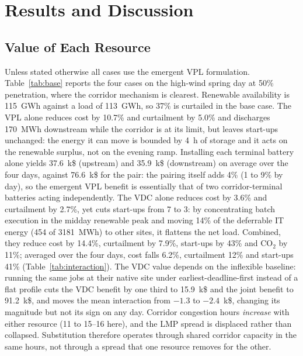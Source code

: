 \documentclass[conference]{IEEEtran}
\begin{document}
\section{Results and Discussion}
\label{sec:results}

\subsection{Value of Each Resource}
Unless stated otherwise all cases use the emergent VPL formulation. Table~\ref{tab:base} reports the four cases on the high-wind spring day at 50\% penetration, where the corridor mechanism is clearest. Renewable availability is 115~GWh against a load of 113~GWh, so 37\% is curtailed in the base case. The VPL alone reduces cost by 10.7\% and curtailment by 5.0\% and discharges 170~MWh downstream while the corridor is at its limit, but leaves start-ups unchanged: the energy it can move is bounded by 4~h of storage and it acts on the renewable surplus, not on the evening ramp. Installing each terminal battery alone yields 37.6~k\$ (upstream) and 35.9~k\$ (downstream) on average over the four days, against 76.6~k\$ for the pair: the pairing itself adds 4\% (1 to 9\% by day), so the emergent VPL benefit is essentially that of two corridor-terminal batteries acting independently. The VDC alone reduces cost by 3.6\% and curtailment by 2.7\%, yet cuts start-ups from 7 to 3: by concentrating batch execution in the midday renewable peak and moving 14\% of the deferrable IT energy (454 of 3181~MWh) to other sites, it flattens the net load. Combined, they reduce cost by 14.4\%, curtailment by 7.9\%, start-ups by 43\% and CO$_2$ by 11\%; averaged over the four days, cost falls 6.2\%, curtailment 12\% and start-ups 41\% (Table~\ref{tab:interaction}). The VDC value depends on the inflexible baseline: running the same jobs at their native site under earliest-deadline-first instead of a flat profile cuts the VDC benefit by one third to 15.9~k\$ and the joint benefit to 91.2~k\$, and moves the mean interaction from $-1.3$ to $-2.4$~k\$, changing its magnitude but not its sign on any day. Corridor congestion hours \emph{increase} with either resource (11 to 15--16 here), and the LMP spread is displaced rather than collapsed. Substitution therefore operates through shared corridor capacity in the same hours, not through a spread that one resource removes for the other.
\end{document}

